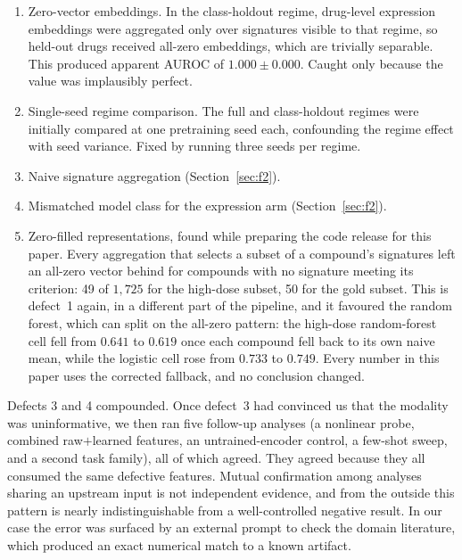 \documentclass[conference]{IEEEtran}
\begin{document}
\begin{enumerate}
    \item Zero-vector embeddings. In the class-holdout regime, drug-level
    expression embeddings were aggregated only over signatures visible to that
    regime, so held-out drugs received all-zero embeddings, which are trivially
    separable.
    This produced apparent AUROC of $1.000 \pm 0.000$. Caught only because the
    value was implausibly perfect.

    \item Single-seed regime comparison. The full and class-holdout
    regimes were initially compared at one pretraining seed each, confounding the
    regime effect with seed variance. Fixed by running three seeds per regime.

    \item Naive signature aggregation (Section~\ref{sec:f2}).

    \item Mismatched model class for the expression arm
    (Section~\ref{sec:f2}).

    \item Zero-filled representations, found while preparing the code
    release for this paper. Every aggregation that selects a subset of a
    compound's signatures left an all-zero vector behind for compounds with no
    signature meeting its criterion: 49 of $1{,}725$ for the high-dose subset,
    50 for the gold subset. This is defect~1 again, in a different part of the
    pipeline, and it favoured the random forest, which can split on the
    all-zero pattern: the high-dose random-forest cell fell from $0.641$ to
    $0.619$ once each compound fell back to its own naive mean, while the
    logistic cell rose from $0.733$ to $0.749$. Every number in this paper uses
    the corrected fallback, and no conclusion changed.
\end{enumerate}

Defects 3 and 4 compounded. Once defect~3 had convinced us that the
modality was uninformative, we then ran five follow-up analyses (a nonlinear
probe, combined raw$+$learned features, an untrained-encoder control, a few-shot
sweep, and a second task family), all of which agreed. They agreed because they
all consumed the same defective features. Mutual confirmation among analyses
sharing an upstream input is not independent evidence, and from the outside this
pattern is nearly indistinguishable from a well-controlled negative result. In our
case the error was surfaced by an external prompt to check the domain literature,
which produced an exact numerical match to a known artifact.
\end{document}

